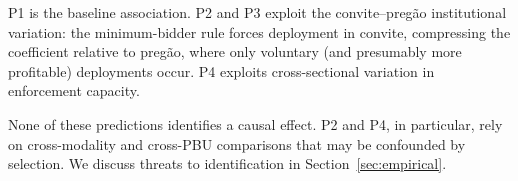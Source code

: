 \noindent P1 is the baseline association. P2 and P3 exploit the
convite--preg\~ao institutional variation: the minimum-bidder rule
forces deployment in convite, compressing the coefficient relative
to preg\~ao, where only voluntary (and presumably more profitable)
deployments occur. P4 exploits cross-sectional variation in
enforcement capacity.

None of these predictions identifies a causal effect. P2 and P4, in
particular, rely on cross-modality and cross-PBU comparisons that
may be confounded by selection. We discuss threats to identification
in Section~\ref{sec:empirical}.
